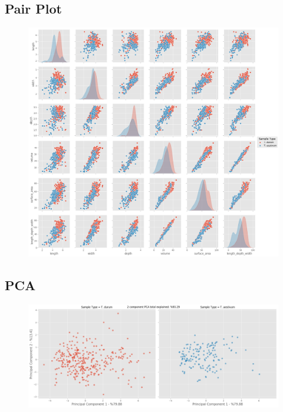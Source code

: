 \documentclass[11pt]{report}
\begin{document}
\subsection{Pair Plot}
\label{sec:org26a9125}

\begin{figure}[htbp]
\centering
\includegraphics[width=18cm]{./images/results/group7/pairplot.png}
\label{fig:org5822f25}
\end{figure}

\clearpage
\subsection{PCA}
\label{sec:orgb5c04d4}
\begin{figure}[htbp]
\centering
\includegraphics[width=18cm]{./images/results/group7/pca.png}
\label{fig:org7bfb453}
\end{figure}
\clearpage
\end{document}
